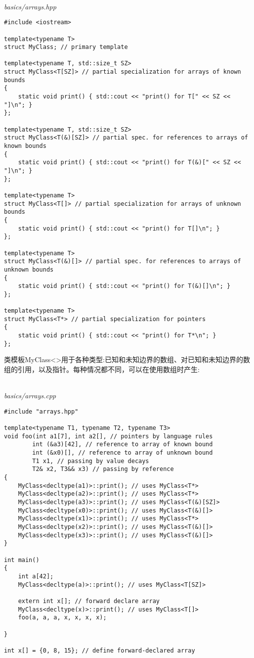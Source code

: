 \hspace*{\fill} \\ %
\noindent
\textit{basics/arrays.hpp}
\begin{lstlisting}[style=styleCXX]
#include <iostream>

template<typename T>
struct MyClass; // primary template

template<typename T, std::size_t SZ>
struct MyClass<T[SZ]> // partial specialization for arrays of known bounds
{
	static void print() { std::cout << "print() for T[" << SZ << "]\n"; }
};

template<typename T, std::size_t SZ>
struct MyClass<T(&)[SZ]> // partial spec. for references to arrays of known bounds
{
	static void print() { std::cout << "print() for T(&)[" << SZ << "]\n"; }
};

template<typename T>
struct MyClass<T[]> // partial specialization for arrays of unknown bounds
{
	static void print() { std::cout << "print() for T[]\n"; }
};

template<typename T>
struct MyClass<T(&)[]> // partial spec. for references to arrays of unknown bounds
{
	static void print() { std::cout << "print() for T(&)[]\n"; }
};

template<typename T>
struct MyClass<T*> // partial specialization for pointers
{
	static void print() { std::cout << "print() for T*\n"; }
};
\end{lstlisting}

类模板MyClass<>用于各种类型:已知和未知边界的数组、对已知和未知边界的数组的引用，以及指针。每种情况都不同，可以在使用数组时产生:

\hspace*{\fill} \\ %
\noindent
\textit{basics/arrays.cpp}
\begin{lstlisting}[style=styleCXX]
#include "arrays.hpp"

template<typename T1, typename T2, typename T3>
void foo(int a1[7], int a2[], // pointers by language rules
		int (&a3)[42], // reference to array of known bound
		int (&x0)[], // reference to array of unknown bound
		T1 x1, // passing by value decays
		T2& x2, T3&& x3) // passing by reference
{
	MyClass<decltype(a1)>::print(); // uses MyClass<T*>
	MyClass<decltype(a2)>::print(); // uses MyClass<T*>
	MyClass<decltype(a3)>::print(); // uses MyClass<T(&)[SZ]>
	MyClass<decltype(x0)>::print(); // uses MyClass<T(&)[]>
	MyClass<decltype(x1)>::print(); // uses MyClass<T*>
	MyClass<decltype(x2)>::print(); // uses MyClass<T(&)[]>
	MyClass<decltype(x3)>::print(); // uses MyClass<T(&)[]>
}

int main()
{
	int a[42];
	MyClass<decltype(a)>::print(); // uses MyClass<T[SZ]>
	
	extern int x[]; // forward declare array
	MyClass<decltype(x)>::print(); // uses MyClass<T[]>
	foo(a, a, a, x, x, x, x);
	
}

int x[] = {0, 8, 15}; // define forward-declared array
\end{lstlisting}

